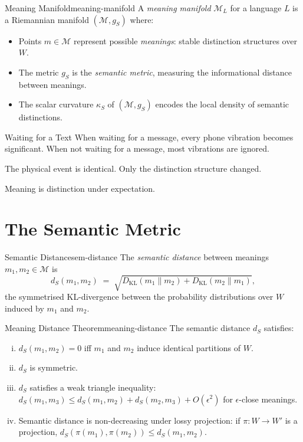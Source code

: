 \documentclass[12pt,twoside,openright]{book}
\begin{document}
\begin{definition}{Meaning Manifold}{meaning-manifold}
  A \emph{meaning manifold} $\mathcal{M}_L$ for a
  language $L$ is a Riemannian manifold
  $(\mathcal{M}, g_S)$ where:
  \begin{itemize}[nosep]
    \item Points $m \in \mathcal{M}$ represent possible
          \emph{meanings}: stable distinction structures
          over $W$.
    \item The metric $g_S$ is the \emph{semantic metric},
          measuring the informational distance between
          meanings.
    \item The scalar curvature $\kappa_S$ of
          $(\mathcal{M}, g_S)$ encodes the local
          density of semantic distinctions.
  \end{itemize}
\end{definition}

\begin{distinctionaside}{Waiting for a Text}
When waiting for a message, every phone vibration becomes
significant. When not waiting for a message, most vibrations
are ignored.

The physical event is identical. Only the distinction
structure changed.

Meaning is distinction under expectation.
\end{distinctionaside}

\section{The Semantic Metric}

\begin{definition}{Semantic Distance}{sem-distance}
  The \emph{semantic distance} between meanings
  $m_1, m_2 \in \mathcal{M}$ is
  \[
    d_S(m_1, m_2)
    \;=\;
    \sqrt{
      D_\mathrm{KL}(m_1 \| m_2)
      + D_\mathrm{KL}(m_2 \| m_1)
    },
  \]
  the symmetrised KL-divergence between the
  probability distributions over $W$ induced by
  $m_1$ and $m_2$.
\end{definition}

\begin{theorem}{Meaning Distance Theorem}{meaning-distance}
  The semantic distance $d_S$ satisfies:
  \begin{enumerate}[(i)]
    \item $d_S(m_1, m_2) = 0$ iff $m_1$ and $m_2$
          induce identical partitions of $W$.
    \item $d_S$ is symmetric.
    \item $d_S$ satisfies a weak triangle inequality:
          $d_S(m_1, m_3) \le d_S(m_1, m_2)
          + d_S(m_2, m_3) + O(\epsilon^2)$ for
          $\epsilon$-close meanings.
    \item Semantic distance is non-decreasing under
          lossy projection: if $\pi: W \to W'$ is a
          projection, $d_S(\pi(m_1), \pi(m_2))
          \le d_S(m_1, m_2)$.
  \end{enumerate}
\end{theorem}
\end{document}
